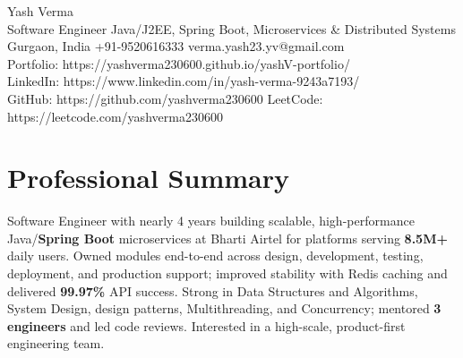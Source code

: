 \documentclass[letterpaper,11pt]{article}
\begin{document}
\begin{center}
  {\Huge Yash Verma} \\
  \small Software Engineer \textbar{} Java/J2EE, Spring Boot, Microservices \& Distributed Systems \\
  \small Gurgaon, India \textbar{} +91-9520616333 \textbar{} verma.yash23.yv@gmail.com \\
  Portfolio: https://yashverma230600.github.io/yashV-portfolio/ \\
  LinkedIn: https://www.linkedin.com/in/yash-verma-9243a7193/ \\
  GitHub: https://github.com/yashverma230600 \textbar{} LeetCode: https://leetcode.com/yashverma230600
\end{center}

\section{Professional Summary}
\begin{itemize}[leftmargin=0.15in, label={}]
  \small{\item{
    Software Engineer with nearly 4 years building scalable, high-performance Java/\textbf{Spring Boot} microservices at Bharti Airtel for platforms serving \textbf{8.5M+} daily users. Owned modules end-to-end across design, development, testing, deployment, and production support; improved stability with Redis caching and delivered \textbf{99.97\%} API success. Strong in Data Structures and Algorithms, System Design, design patterns, Multithreading, and Concurrency; mentored \textbf{3 engineers} and led code reviews. Interested in a high-scale, product-first engineering team.
  }}
\end{itemize}
\vspace{-8pt}

\end{document}
